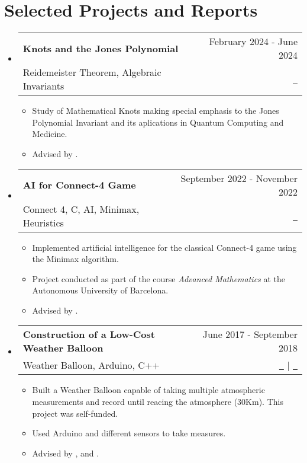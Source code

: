 \documentclass[a4paper,11pt,dvipsnames]{article}
\makeatletter
\newcommand{\resumeQuadHeading}[4]{
	\item
	\begin{tabular*}{0.96\textwidth}[t]{l@{\extracolsep{\fill}}r}
		\textbf{#1} & \small #2 \\
		\small#3 & \small #4 \\
	\end{tabular*}
}
\newcommand{\resumeHeadingListStart}{
	\begin{itemize}[leftmargin=0.15in, label={}]
	}
\newcommand{\resumeHeadingListEnd}{\end{itemize}}
\makeatother
\begin{document}
	
	\section{Selected Projects and Reports}
	\resumeHeadingListStart{}
	\resumeQuadHeading{Knots and the Jones Polynomial}{February 2024 - June 2024}{Reidemeister Theorem, Algebraic Invariants}{\href{https://github.com/Tutusaus/Knot_Theory/blob/master/TFG/main.pdf}{\faFileTextO \ \graydotuline{Report}}}
	\begin{itemize}[leftmargin=3em, itemsep=0.1em, topsep=2pt]
		\item \small Study of Mathematical Knots making special emphasis to the Jones Polynomial Invariant and its aplications in Quantum Computing and Medicine.
		\item \small Advised by \href{https://portalrecerca.uab.cat/en/persons/joan-porti-pique-3}{}.
	\end{itemize}
	\resumeHeadingListEnd{}
	
	\resumeHeadingListStart{}
	\resumeQuadHeading{AI for Connect-4 Game}{September 2022 - November 2022}{Connect 4, C, AI, Minimax, Heuristics}{\href{https://github.com/Tutusaus/4_en_Ratlla}{\faGithub \ \graydotuline{Code}}}
	\begin{itemize}[leftmargin=3em, itemsep=0.1em, topsep=2pt]
		\item \small Implemented artificial intelligence for the classical Connect-4 game using the Minimax algorithm.
		\item \small Project conducted as part of the course \textit{Advanced Mathematics} at the Autonomous University of Barcelona.
		\item \small Advised by \href{https://portalrecerca.uab.cat/en/persons/vicente-soler-ruz}{}.
	\end{itemize}
	\resumeHeadingListEnd{}
	
	\resumeHeadingListStart{}
	\resumeQuadHeading{Construction of a Low-Cost Weather Balloon}{June 2017 - September 2018}{Weather Balloon, Arduino, C++}{\href{https://guillemtutusausalcaraz.weebly.com/weatherballoon.html}{\faFileTextO \ \graydotuline{Report}} $ | $ \href{https://github.com/Tutusaus/Weather-Balloon}{\faGithub \ \graydotuline{Code}}}
	\begin{itemize}[leftmargin=3em, itemsep=0.1em, topsep=2pt]
		\item \small Built a Weather Balloon capable of taking multiple atmospheric measurements and record until reacing the atmosphere (30Km). This project was self-funded.
		\item \small Used Arduino and different sensors to take measures.
		\item \small Advised by \href{https://www.linkedin.com/in/ingrid-mu%C3%B1oz-fern%C3%A1ndez-07796920/?originalSubdomain=es}{\graydotuline{Íngrid Muñoz}}, \href{https://www.linkedin.com/in/joshua-tristancho-%E5%90%89-b2444517/}{\graydotuline{Joshua Tristancho}} and  \href{https://www.linkedin.com/in/n%C3%BAria-sal%C3%A1n-1820b71b/}{\graydotuline{Núria Salán}}.
	\end{itemize}
	\resumeHeadingListEnd{}
	
\end{document}
